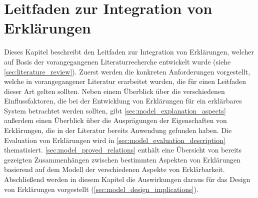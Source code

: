 \chapter{Leitfaden zur Integration von Erklärungen}
\label{ch:explanation_guideline}

Dieses Kapitel beschreibt den Leitfaden zur Integration von Erklärungen, welcher auf Basis der vorangegangenen Literaturrecherche entwickelt wurde (siehe \autoref{sec:literature_review}). Zuerst werden die konkreten Anforderungen vorgestellt, welche in vorangegangener Literatur erarbeitet wurden, die für einen Leitfaden dieser Art gelten sollten. Neben einem Überblick über die verschiedenen Einflussfaktoren, die bei der Entwicklung von Erklärungen für ein erklärbares System betrachtet werden sollten, gibt \autoref{sec:model_explanation_aspects} außerdem einen Überblick über die Ausprägungen der Eigenschaften von Erklärungen, die in der Literatur bereits Anwendung gefunden haben. Die Evaluation von Erklärungen wird in \autoref{sec:model_evaluation_description} thematisiert. \autoref{sec:model_proved_relations} enthält eine Übersicht von bereits gezeigten Zusammenhängen zwischen bestimmten Aspekten von Erklärungen basierend auf dem Modell der verschiedenen Aspekte von Erklärbarkeit. Abschließend werden in diesem Kapitel die Auswirkungen daraus für das Design von Erklärungen vorgestellt (\autoref{sec:model_design_implications}).

% 





\newpage

